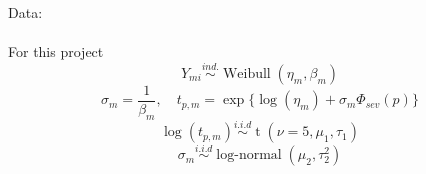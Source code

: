 \documentclass{article}
\begin{document}
Data:\\\\
For this project
\[Y_{mi} \stackrel{ind.}{\sim} \operatorname{Weibull}(\eta_m, \beta_m)\]
\[\sigma_m = \frac{1}{\beta_m}, \quad t_{p,m} = \exp\{\log(\eta_m) + \sigma_m \Phi_{sev}(p)\}\]
\[\log(t_{p,m}) \stackrel{i.i.d}{\sim} \operatorname{t}(\nu = 5, \mu_1, \tau_1)\]
\[\sigma_m \stackrel{i.i.d}{\sim} \operatorname{log-normal}(\mu_2, \tau^2_2)\]
\end{document}
